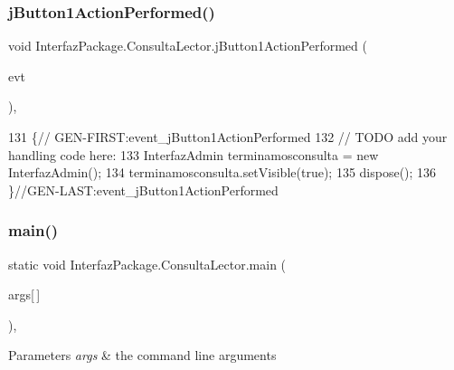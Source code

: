 \subsubsection{\texorpdfstring{j\+Button1\+Action\+Performed()}{jButton1ActionPerformed()}}
{\footnotesize\ttfamily void Interfaz\+Package.\+Consulta\+Lector.\+j\+Button1\+Action\+Performed (\begin{DoxyParamCaption}\item[{java.\+awt.\+event.\+Action\+Event}]{evt }\end{DoxyParamCaption})\hspace{0.3cm}{\ttfamily [inline]}, {\ttfamily [private]}}


\begin{DoxyCode}
131                                                                          \{\textcolor{comment}{//
      GEN-FIRST:event\_jButton1ActionPerformed}
132         \textcolor{comment}{// TODO add your handling code here:}
133         InterfazAdmin terminamosconsulta = \textcolor{keyword}{new} InterfazAdmin();
134         terminamosconsulta.setVisible(\textcolor{keyword}{true});
135         dispose();
136     \}\textcolor{comment}{//GEN-LAST:event\_jButton1ActionPerformed}
\end{DoxyCode}
\mbox{\label{class_interfaz_package_1_1_consulta_lector_a0880f06bffeb16717c3f6af391316bb4}} 
\subsubsection{\texorpdfstring{main()}{main()}}
{\footnotesize\ttfamily static void Interfaz\+Package.\+Consulta\+Lector.\+main (\begin{DoxyParamCaption}\item[{String}]{args\mbox{[}$\,$\mbox{]} }\end{DoxyParamCaption})\hspace{0.3cm}{\ttfamily [inline]}, {\ttfamily [static]}}


\begin{DoxyParams}{Parameters}
{\em args} & the command line arguments \\
\hline
\end{DoxyParams}

